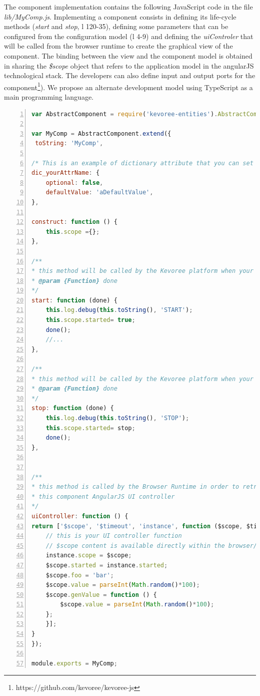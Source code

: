 The component implementation contains the following JavaScript code in the file \emph{lib/MyComp.js}. Implementing a component consists in defining its life-cycle methods (\emph{start} and \emph{stop}, l 120-35), defining some parameters that can be configured from the configuration model (l 4-9) and defining the \emph{uiControler} that will be called from the browser runtime to create the graphical view of the component. The binding between the view and the component model is obtained in sharing the \emph{\$scope} object  that refers to the application model in the angularJS technological stack. The developers can also define input and output ports for the component\footnote{https://github.com/kevoree/kevoree-js}). We propose an alternate development model using TypeScript as a main programming language. 



\begin{lstlisting}[language=JavaScript,numbers=left,firstnumber=1,basicstyle=\scriptsize,deletekeywords={port}]
var AbstractComponent = require('kevoree-entities').AbstractComponent;

var MyComp = AbstractComponent.extend({
 toString: 'MyComp',

/* This is an example of dictionary attribute that you can set for your entity */
dic_yourAttrName: {
	optional: false,
	defaultValue: 'aDefaultValue',
},

construct: function () {
	this.scope ={};
},

/**
* this method will be called by the Kevoree platform when your component has to start
* @param {Function} done
*/
start: function (done) {
	this.log.debug(this.toString(), 'START');
	this.scope.started= true;
	done();
	//...
},

/**
* this method will be called by the Kevoree platform when your component has to stop
* @param {Function} done
*/
stop: function (done) {
	this.log.debug(this.toString(), 'STOP');
	this.scope.started= stop;
	done();
},


/**
* this method is called by the Browser Runtime in order to retrieve
* this component AngularJS UI controller
*/
uiController: function () {
return ['$scope', '$timeout', 'instance', function ($scope, $timeout, instance) {
	// this is your UI controller function
	// $scope content is available directly within the browser/kevoree-comp-foocomp.html file
	instance.scope = $scope;
	$scope.started = instance.started;
	$scope.foo = 'bar';
	$scope.value = parseInt(Math.random()*100);
	$scope.genValue = function () {
		$scope.value = parseInt(Math.random()*100);
	};
	}];
}
});

module.exports = MyComp;
\end{lstlisting}


